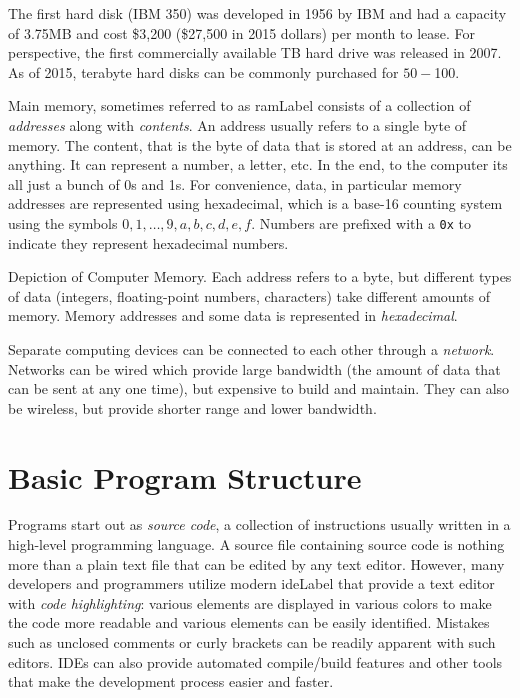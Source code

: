 The first hard disk (IBM 350) was developed in 1956 by IBM and had a capacity of
3.75MB and cost \$3,200 (\$27,500 in 2015 dollars) per month to lease.
For perspective, the first commercially available TB hard drive was released in 2007.
As of 2015, terabyte hard disks can be commonly purchased for $50-$100.  

Main memory, sometimes referred to as \gls{ramLabel} consists of a collection
of \emph{addresses} along with \emph{contents}.  An address usually refers
to a single byte of memory.  The content, that is the byte of data that is stored at an address,
can be anything.  It can represent a number, a letter, etc.  In the end, to the computer
its all just a bunch of 0s and 1s.  For convenience, data, in particular memory
addresses are represented using hexadecimal, which is a base-16 counting
system using the symbols $0, 1, \ldots, 9, a, b, c, d, e, f$.  Numbers
are prefixed with a \texttt{0x} to indicate they represent hexadecimal numbers.

\begin{table}
\centering

\caption[Depiction of Computer Memory]{Depiction of Computer Memory.  Each address 
refers to a byte, but different types of data (integers, floating-point numbers, characters) take
different amounts of memory.  Memory addresses and some data is represented in 
\emph{hexadecimal}.}
\end{table}

Separate computing devices can be connected to each other through
a \emph{network}.  Networks can be wired which provide large bandwidth 
(the amount of data that can be sent at any one time), but expensive to
build and maintain.  They can also be wireless, but provide shorter range
and lower bandwidth.  

\section{Basic Program Structure}

Programs start out as \emph{source code}, a collection of instructions usually written
in a high-level programming language.  A source file containing source code is nothing
more than a plain text file that can be edited by any text editor.  However, many 
developers and programmers utilize modern \gls{ideLabel} 
that provide a text editor with \emph{code highlighting}: various elements are 
displayed in various colors to make the code more readable and various elements
can be easily identified.  Mistakes such as unclosed comments or curly brackets
can be readily apparent with such editors.  IDEs can also provide automated 
compile/build features and other tools that make the development process easier
and faster.

